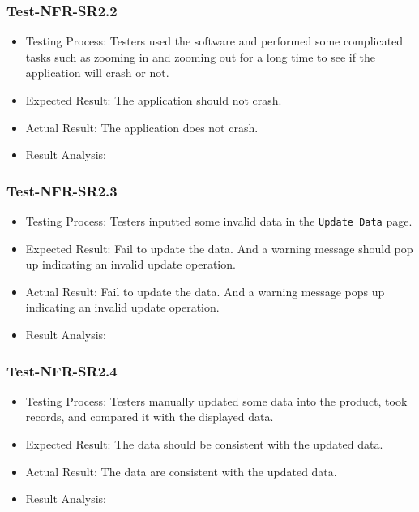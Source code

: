 \documentclass[12pt, titlepage]{article}
\begin{document}
\subsubsection{Test-NFR-SR2.2}
\begin{itemize}

    \item Testing Process:  Testers used the software and performed some complicated tasks such as zooming in and zooming out for a long time to see if the application will crash or not.
    \item Expected Result: The application should not crash.
    \item Actual Result: The application does not crash.
    \item Result Analysis: \pass
\end{itemize}

\subsubsection{Test-NFR-SR2.3}
\begin{itemize}

    \item Testing Process:   Testers inputted some invalid data in the \verb|Update Data| page.
    \item Expected Result: Fail to update the data. And a warning message should pop up indicating an invalid update
operation.
    \item Actual Result: Fail to update the data. And a warning message pops up indicating an invalid update
operation.
    \item Result Analysis: \pass
\end{itemize}


\subsubsection{Test-NFR-SR2.4}
\begin{itemize}
    \item Testing Process: Testers manually updated some data into the product, took records, and compared it with the displayed data.
    \item Expected Result: The data should be consistent with the updated data.
    \item Actual Result: The data are consistent with the updated data. 
    \item Result Analysis: \pass
\end{itemize}
\end{document}
